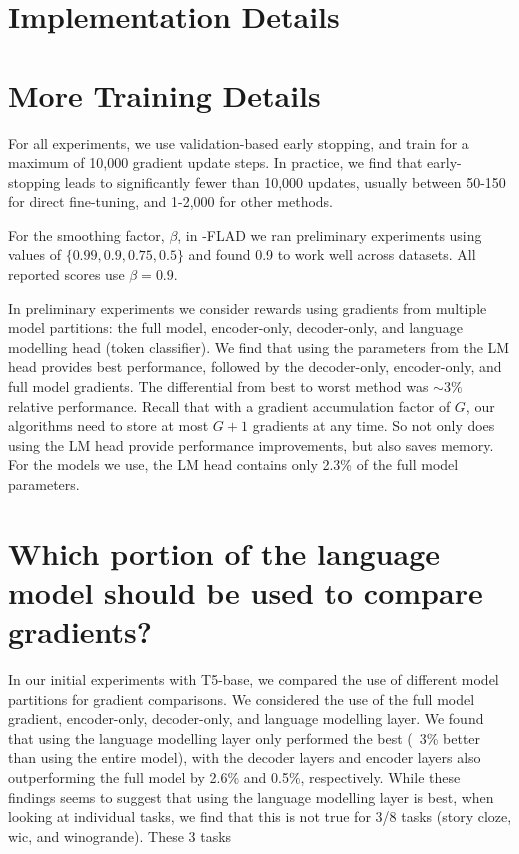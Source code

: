 \appendix

\section{Implementation Details}
\label{sec:implementation_details}

\section{More Training Details}
For all experiments, we use validation-based early stopping, and train for a maximum of 10,000 gradient update steps. In practice, we find that early-stopping leads to significantly fewer than 10,000 updates, usually between 50-150 for direct fine-tuning, and 1-2,000 for other methods.

For the smoothing factor, $\beta$, in \ucb{}-FLAD we ran preliminary experiments using values of $\{0.99, 0.9, 0.75, 0.5\}$ and found 0.9 to work well across datasets. All reported scores use $\beta=0.9$.

In preliminary experiments we consider rewards using gradients from multiple model partitions: the full model, encoder-only, decoder-only, and language modelling head (token classifier). We find that using the parameters from the LM head provides best performance, followed by the decoder-only, encoder-only, and full model gradients. The differential from best to worst method was $\sim3\%$ relative performance. Recall that with a gradient accumulation factor of $G$, our algorithms need to store at most $G+1$ gradients at any time. So not only does using the LM head provide performance improvements, but also saves memory. For the models we use, the LM head contains only 2.3\% of the full model parameters.

\section{Which portion of the language model should be used to compare gradients?}
In our initial experiments with T5-base, we compared the use of different model partitions for gradient comparisons. We considered the use of the full model gradient, encoder-only, decoder-only, and language modelling layer. We found that using the language modelling layer only performed the best (~3\% better than using the entire model), with the decoder layers and encoder layers also outperforming the full model by 2.6\% and 0.5\%, respectively.
While these findings seems to suggest that using the language modelling layer is best, when looking at individual tasks, we find that this is not true for 3/8 tasks (story cloze, wic, and winogrande). These 3 tasks 


